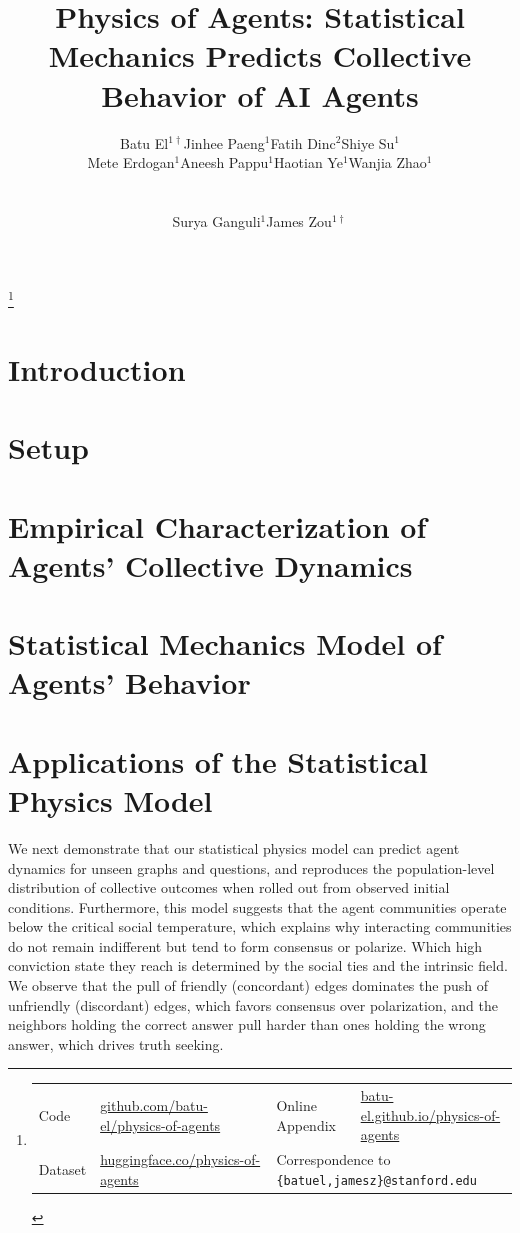 \documentclass{article}
\title{Physics of Agents: Statistical Mechanics Predicts Collective Behavior of AI Agents}
\author{%
  \begin{tabular}{cccc}
    Batu El$^{1\dag}$ & Jinhee Paeng$^{1}$ & Fatih Dinc$^{2}$ & Shiye Su$^{1}$ \\[0.6em] Mete Erdogan$^{1}$ &
    Aneesh Pappu$^{1}$  
    & Haotian Ye$^{1}$
     & Wanjia Zhao$^{1}$ 
  \end{tabular} \\[0.6em]
  \begin{tabular}{ccc}
   & Surya Ganguli$^{1}$ & James Zou$^{1\dag}$
  \end{tabular}
}
\affiliation{$^{1}$Stanford University \quad $^{2}$UC Santa Barbara \quad 
}
\newcommand{\blfootnote}[1]{%
  \begingroup
  \renewcommand\thefootnote{}\footnote{#1}%
  \addtocounter{footnote}{-1}%
  \endgroup
}
\begin{document}
\blfootnote{%
\centering
\begin{tabular}{llll}
Code & \href{https://github.com/batu-el/physics-of-agents}{github.com/batu-el/physics-of-agents} &
Online Appendix & \href{https://batu-el.github.io/physics-of-agents}{batu-el.github.io/physics-of-agents} \\
Dataset & \href{https://huggingface.co/physics-of-agents}{huggingface.co/physics-of-agents}
&
\multicolumn{2}{l}{{\dag} Correspondence to \texttt{\{batuel,jamesz\}@stanford.edu}}
\end{tabular}%
}

\maketitle

\vspace{-0.5cm}


\section{Introduction}\label{sec:intro}


\section{Setup}\label{sec:setup}


\section{Empirical Characterization of Agents' Collective Dynamics}\label{sec:observations}



\section{Statistical Mechanics Model of Agents' Behavior}\label{sec:method}



\section{Applications of the Statistical Physics Model}\label{sec:results}
We next demonstrate that our statistical physics model can predict
agent dynamics for unseen graphs and questions, and reproduces the population-level
distribution of collective outcomes when rolled out from observed initial conditions.
Furthermore, this model suggests that the agent communities operate below the critical social temperature,
which explains why interacting communities do not remain indifferent but tend to form consensus or polarize. Which high conviction state they reach is determined by the social ties and the intrinsic field. We observe that the pull of friendly (concordant) edges dominates the push of unfriendly (discordant) edges, which favors consensus over polarization, and the neighbors holding the correct answer pull harder than ones holding the wrong answer, which drives truth seeking.
\end{document}
